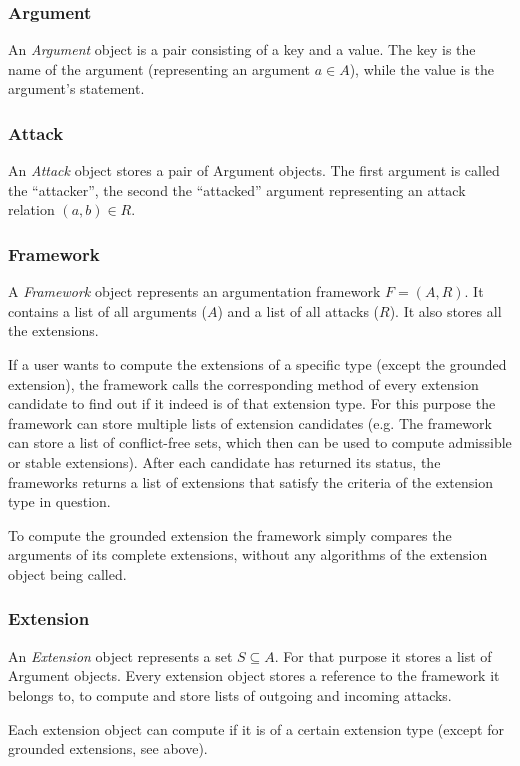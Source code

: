 \documentclass[draft,final]{vutinfth} %
\newcommand{\hl}{\par\vspace{6pt}} %
\begin{document}
\subsubsection{Argument}
An \emph{Argument} object is a pair consisting of a key and a value. The key is the name of the argument (representing an argument $a\in A$), while the value is the argument's statement.

\subsubsection{Attack}
An \emph{Attack} object stores a pair of Argument objects. The first argument is called the ``attacker'', the second the ``attacked'' argument representing an attack relation $(a,b)\in R$.

\subsubsection{Framework}
A \emph{Framework} object represents an argumentation framework $F=(A,R)$. It contains a list of all arguments ($A$) and a list of all attacks ($R$). It also stores all the extensions.\hl
If a user wants to compute the extensions of a specific type (except the grounded extension), the framework calls the corresponding method of every extension candidate to find out if it indeed is of that extension type. For this purpose the framework can store multiple lists of extension candidates (e.g. The framework can store a list of conflict-free sets, which then can be used to compute admissible or stable extensions). After each candidate has returned its status, the frameworks returns a list of extensions that satisfy the criteria of the extension type in question.\hl
To compute the grounded extension the framework simply compares the arguments of its complete extensions, without any algorithms of the extension object being called.

\subsubsection{Extension}
An \emph{Extension} object represents a set $S\subseteq A$. For that purpose it stores a list of Argument objects. Every extension object stores a reference to the framework it belongs to, to compute and store lists of outgoing and incoming attacks.\hl
Each extension object can compute if it is of a certain extension type (except for grounded extensions, see above). %


\backmatter

\listoffigures

%
%
\printbibliography

\end{document}
